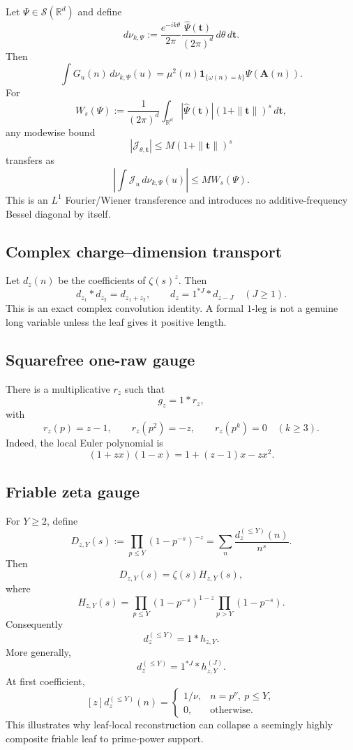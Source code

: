 \documentclass[11pt]{article}
\theoremstyle{definition}
\theoremstyle{remark}
\newcommand{\1}{\mathbf 1}
\begin{document}
Let \(\Psi\in\mathcal S(\mathbb R^d)\) and define
\[
 d\nu_{k,\Psi}
 :=\frac{e^{-ik\theta}}{2\pi}
 \frac{\widehat\Psi(\bm t)}{(2\pi)^d}\,d\theta\,d\bm t.
\]
Then
\[
 \int G_u(n)\,d\nu_{k,\Psi}(u)
 =\mu^2(n)\1_{\{\omega(n)=k\}}\Psi(\bm A(n)).
\]
For
\[
 W_s(\Psi):=\frac1{(2\pi)^d}\int_{\mathbb R^d}
 |\widehat\Psi(\bm t)|(1+\|\bm t\|)^s\,d\bm t,
\]
any modewise bound
\[
 |\mathcal J_{\theta,\bm t}|
 \le M(1+\|\bm t\|)^s
\]
transfers as
\[
 \left|\int\mathcal J_u\,d\nu_{k,\Psi}(u)\right|
 \le M W_s(\Psi).
\]
This is an \(L^1\) Fourier/Wiener transference and introduces no additive-frequency Bessel diagonal by itself.

\subsection{Complex charge--dimension transport}

Let \(d_z(n)\) be the coefficients of \(\zeta(s)^z\).  Then
\[
 d_{z_1}*d_{z_2}=d_{z_1+z_2},
 \qquad
 d_z=1^{*J}*d_{z-J}\quad(J\ge1).
\]
This is an exact complex convolution identity.  A formal \(1\)-leg is not a genuine long variable unless the leaf gives it positive length.

\subsection{Squarefree one-raw gauge}

There is a multiplicative \(r_z\) such that
\[
 g_z=1*r_z,
\]
with
\[
 r_z(p)=z-1,
 \qquad
 r_z(p^2)=-z,
 \qquad
 r_z(p^k)=0\quad(k\ge3).
\]
Indeed, the local Euler polynomial is
\[
 (1+zx)(1-x)=1+(z-1)x-zx^2.
\]

\subsection{Friable zeta gauge}

For \(Y\ge2\), define
\[
 D_{z,Y}(s):=\prod_{p\le Y}(1-p^{-s})^{-z}
 =\sum_n\frac{d_z^{(\le Y)}(n)}{n^s}.
\]
Then
\[
 D_{z,Y}(s)=\zeta(s)H_{z,Y}(s),
\]
where
\[
 H_{z,Y}(s)
 =\prod_{p\le Y}(1-p^{-s})^{1-z}
 \prod_{p>Y}(1-p^{-s}).
\]
Consequently
\[
 d_z^{(\le Y)}=1*h_{z,Y}.
\]
More generally,
\[
 d_z^{(\le Y)}=1^{*J}*h^{(J)}_{z,Y}.
\]
At first coefficient,
\[
 [z]d_z^{(\le Y)}(n)
 =\begin{cases}
 1/\nu,&n=p^\nu,\ p\le Y,\\
 0,&\text{otherwise}.
 \end{cases}
\]
This illustrates why leaf-local reconstruction can collapse a seemingly highly composite friable leaf to prime-power support.
\end{document}
